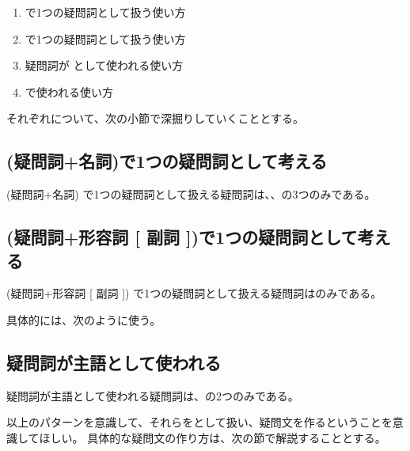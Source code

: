     \begin{enumerate}[itemsep=0.8em]
        \item {}で1つの疑問詞として扱う使い方
        \item {}で1つの疑問詞として扱う使い方
        \item 疑問詞が として使われる使い方
        \item {}で使われる使い方
    \end{enumerate}

    それぞれについて、次の小節で深掘りしていくこととする。
\newpage

\subsection{(疑問詞+名詞)で1つの疑問詞として考える}
    (疑問詞+名詞) で1つの疑問詞として扱える疑問詞は、、の3つのみである。

\subsection{(疑問詞+形容詞 [ 副詞 ])で1つの疑問詞として考える}
    (疑問詞+形容詞 [ 副詞 ]) で1つの疑問詞として扱える疑問詞はのみである。

    具体的には、次のように使う。

\subsection{疑問詞が主語として使われる}
    疑問詞が主語として使われる疑問詞は、の2つのみである。



\vspace{2em}

    以上のパターンを意識して、それらをとして扱い、疑問文を作るということを意識してほしい。
    具体的な疑問文の作り方は、次の節で解説することとする。


\newpage
